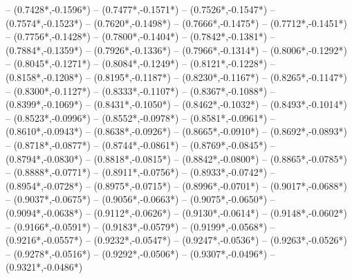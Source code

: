 {	-- ({0.7428*\dx},{-0.1596*\dy})
	-- ({0.7477*\dx},{-0.1571*\dy})
	-- ({0.7526*\dx},{-0.1547*\dy})
	-- ({0.7574*\dx},{-0.1523*\dy})
	-- ({0.7620*\dx},{-0.1498*\dy})
	-- ({0.7666*\dx},{-0.1475*\dy})
	-- ({0.7712*\dx},{-0.1451*\dy})
	-- ({0.7756*\dx},{-0.1428*\dy})
	-- ({0.7800*\dx},{-0.1404*\dy})
	-- ({0.7842*\dx},{-0.1381*\dy})
	-- ({0.7884*\dx},{-0.1359*\dy})
	-- ({0.7926*\dx},{-0.1336*\dy})
	-- ({0.7966*\dx},{-0.1314*\dy})
	-- ({0.8006*\dx},{-0.1292*\dy})
	-- ({0.8045*\dx},{-0.1271*\dy})
	-- ({0.8084*\dx},{-0.1249*\dy})
	-- ({0.8121*\dx},{-0.1228*\dy})
	-- ({0.8158*\dx},{-0.1208*\dy})
	-- ({0.8195*\dx},{-0.1187*\dy})
	-- ({0.8230*\dx},{-0.1167*\dy})
	-- ({0.8265*\dx},{-0.1147*\dy})
	-- ({0.8300*\dx},{-0.1127*\dy})
	-- ({0.8333*\dx},{-0.1107*\dy})
	-- ({0.8367*\dx},{-0.1088*\dy})
	-- ({0.8399*\dx},{-0.1069*\dy})
	-- ({0.8431*\dx},{-0.1050*\dy})
	-- ({0.8462*\dx},{-0.1032*\dy})
	-- ({0.8493*\dx},{-0.1014*\dy})
	-- ({0.8523*\dx},{-0.0996*\dy})
	-- ({0.8552*\dx},{-0.0978*\dy})
	-- ({0.8581*\dx},{-0.0961*\dy})
	-- ({0.8610*\dx},{-0.0943*\dy})
	-- ({0.8638*\dx},{-0.0926*\dy})
	-- ({0.8665*\dx},{-0.0910*\dy})
	-- ({0.8692*\dx},{-0.0893*\dy})
	-- ({0.8718*\dx},{-0.0877*\dy})
	-- ({0.8744*\dx},{-0.0861*\dy})
	-- ({0.8769*\dx},{-0.0845*\dy})
	-- ({0.8794*\dx},{-0.0830*\dy})
	-- ({0.8818*\dx},{-0.0815*\dy})
	-- ({0.8842*\dx},{-0.0800*\dy})
	-- ({0.8865*\dx},{-0.0785*\dy})
	-- ({0.8888*\dx},{-0.0771*\dy})
	-- ({0.8911*\dx},{-0.0756*\dy})
	-- ({0.8933*\dx},{-0.0742*\dy})
	-- ({0.8954*\dx},{-0.0728*\dy})
	-- ({0.8975*\dx},{-0.0715*\dy})
	-- ({0.8996*\dx},{-0.0701*\dy})
	-- ({0.9017*\dx},{-0.0688*\dy})
	-- ({0.9037*\dx},{-0.0675*\dy})
	-- ({0.9056*\dx},{-0.0663*\dy})
	-- ({0.9075*\dx},{-0.0650*\dy})
	-- ({0.9094*\dx},{-0.0638*\dy})
	-- ({0.9112*\dx},{-0.0626*\dy})
	-- ({0.9130*\dx},{-0.0614*\dy})
	-- ({0.9148*\dx},{-0.0602*\dy})
	-- ({0.9166*\dx},{-0.0591*\dy})
	-- ({0.9183*\dx},{-0.0579*\dy})
	-- ({0.9199*\dx},{-0.0568*\dy})
	-- ({0.9216*\dx},{-0.0557*\dy})
	-- ({0.9232*\dx},{-0.0547*\dy})
	-- ({0.9247*\dx},{-0.0536*\dy})
	-- ({0.9263*\dx},{-0.0526*\dy})
	-- ({0.9278*\dx},{-0.0516*\dy})
	-- ({0.9292*\dx},{-0.0506*\dy})
	-- ({0.9307*\dx},{-0.0496*\dy})
	-- ({0.9321*\dx},{-0.0486*\dy})
}
